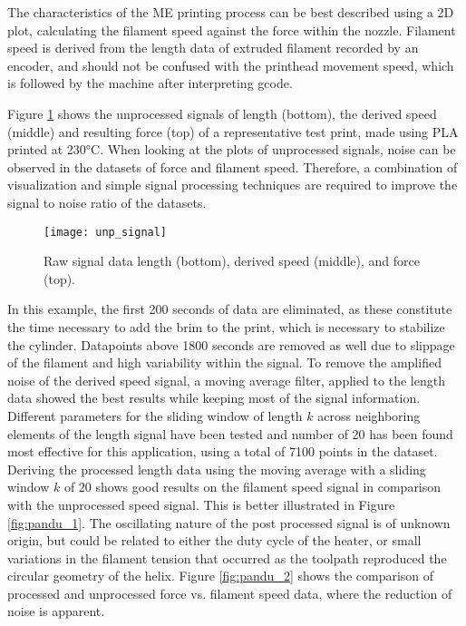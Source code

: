 \documentclass[main.tex]{subfiles}
\begin{document}
The characteristics of the ME printing process can be best described using a 2D plot, calculating the filament speed against the force within the nozzle. Filament speed is derived from the length data of extruded filament recorded by an encoder, and should not be confused with the printhead movement speed, which is followed by the machine after interpreting gcode.
 
Figure \ref{fig:unp_data} shows the unprocessed signals of length (bottom), the derived speed (middle) and resulting force (top) of a representative test print, made using PLA printed at 230°C. When looking at the plots of unprocessed signals, noise can be observed in the datasets of force and filament speed. Therefore, a combination of visualization and simple signal processing techniques are required to improve the signal to noise ratio of the datasets.

\begin{figure}[!htbp]
	\center
	\texttt{[image: unp\_signal]}
	\caption{Raw signal data length (bottom), derived speed (middle), and force (top).} \label{fig:unp_data}
\end{figure}

In this example, the first 200 seconds of data are eliminated, as these constitute the time necessary to add the brim to the print, which is necessary to stabilize the cylinder. Datapoints above 1800 seconds are removed as well due to slippage of the filament and high variability within the signal. To remove the amplified noise of the derived speed signal, a moving average filter, applied to the length data showed the best results while keeping most of the signal information. Different parameters for the sliding window of length $k$ across neighboring elements of the length signal have been tested and number of 20 has been found most effective for this application, using a total of 7100 points in the dataset. Deriving the processed length data using the moving average with a sliding window $k$ of 20 shows good results on the filament speed signal in comparison with the unprocessed speed signal. This is better illustrated in Figure \ref{fig:pandu_1}. The oscillating nature of the post processed signal is of unknown origin, but could be related to either the duty cycle of the heater, or small variations in the filament tension that occurred as the toolpath reproduced the circular geometry of the helix. Figure \ref{fig:pandu_2} shows the comparison of processed and unprocessed force vs. filament speed data, where the reduction of noise is apparent.
\end{document}
